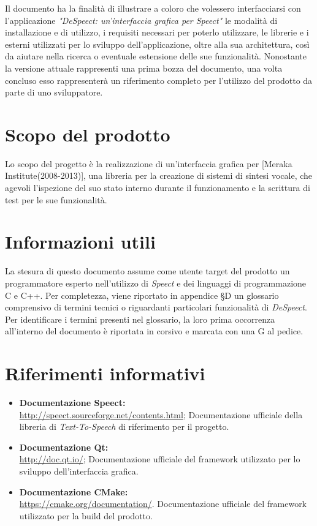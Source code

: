 \documentclass[openany,12pt,a4paper]{report}
\begin{document}
	Il documento ha la finalità di illustrare a coloro che volessero interfacciarsi con l’applicazione
	\textit{"DeSpeect: un'interfaccia grafica per Speect"} le modalità di installazione e di utilizzo, i requisiti necessari per poterlo utilizzare, le librerie e i  esterni utilizzati per lo sviluppo dell’applicazione,
	oltre alla sua architettura, così da aiutare
	nella ricerca o eventuale estensione delle sue funzionalità. Nonostante la versione attuale rappresenti una prima bozza del documento, una volta concluso esso rappresenterà un riferimento completo per l’utilizzo del prodotto da parte di uno sviluppatore.
	
	\section{Scopo del prodotto}
	
	Lo scopo del progetto è la realizzazione di un’interfaccia grafica per  [Meraka Institute(2008-2013)], una libreria per la creazione di sistemi di sintesi vocale, che agevoli l’ispezione del suo stato interno durante il funzionamento e la scrittura di test per le sue funzionalità.
	
	\section{Informazioni utili}
	
	La stesura di questo documento assume come utente target del prodotto un programmatore esperto nell'utilizzo di \textit{Speect} e dei linguaggi di programmazione C e C++.
	Per completezza, viene riportato in appendice §D un glossario comprensivo di termini tecnici o riguardanti particolari funzionalità di \textit{DeSpeect}. Per identificare i termini
	presenti nel glossario, la loro prima occorrenza all’interno del documento è riportata in corsivo e
	marcata con una G al pedice.
	
	\section{Riferimenti informativi}
	
	\begin{itemize}
		\item \textbf{Documentazione Speect:} \\
		\url{http://speect.sourceforge.net/contents.html};
		\subitem Documentazione ufficiale della libreria di \textit{Text-To-Speech} di riferimento per il progetto.
		
		\item \textbf{Documentazione Qt:} \\
		\url{http://doc.qt.io/};
		\subitem Documentazione ufficiale del framework utilizzato per lo sviluppo dell'interfaccia grafica.
		
		\item \textbf{Documentazione CMake:} \\
		\url{https://cmake.org/documentation/}.
		\subitem Documentazione ufficiale del framework utilizzato per la build del prodotto. 
	\end{itemize}
\end{document}
